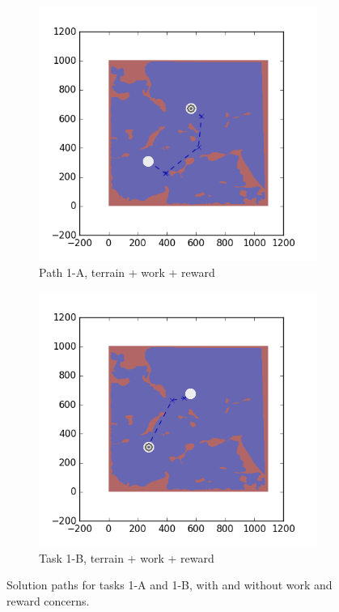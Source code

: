 \documentclass{tamuccthesis}
\begin{document}
\begin{figure}[H]
  \begin{subfigure}[b]{0.4\textwidth}
        \centering
        \includegraphics[width=\textwidth,trim={3cm 3cm 3cm 3cm},clip]{EXP3RG_PathAa_-1_-1_-1_-1.png}
        \caption{{\small Path 1-A, terrain + work + reward}}
        \label{fig:Path_1-A_terrain_work_reward}
    \end{subfigure}
    \hfill
    \begin{subfigure}[b]{0.4\textwidth}  
        \centering 
        \includegraphics[width=\textwidth,trim={3cm 3cm 3cm 3cm},clip]{EXP3RG_PathAb_-1_-1_-1_-1.png}
        \caption{{\small Task 1-B, terrain + work + reward}}
        \label{fig:Path_5-B_terrain_work_reward}
    \end{subfigure}
      
    \caption{Solution paths for tasks 1-A and 1-B, with and without work and reward concerns.}
    \label{fig:Paths_1-A_1-B}
\end{figure}
\end{document}
